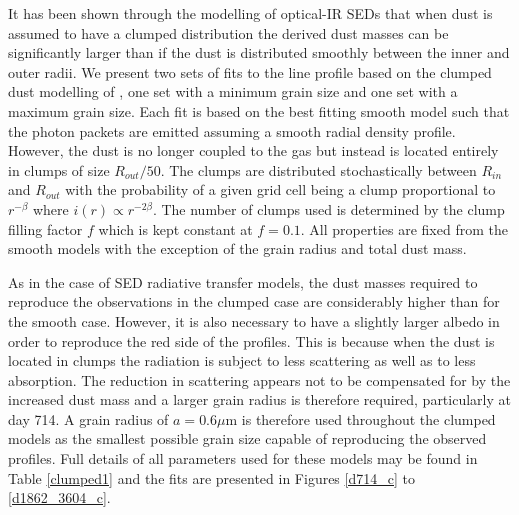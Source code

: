 \documentclass[useAMS,usenatbib,usegraphicx]{mnras}
\begin{document}
It has been shown through the modelling of optical-IR SEDs that when dust 
is assumed to have a clumped distribution the derived dust masses can be 
significantly larger than if the dust is distributed smoothly between the 
inner and outer radii.  We present two sets of fits to the line profile based on 
the clumped dust modelling of \citet{Wesson2015}, one set with a minimum grain size and one set with a maximum grain size.  Each fit is based on the best 
fitting smooth model such that the photon packets are emitted assuming a smooth 
radial density profile.  However, the dust is no longer coupled to the gas 
but instead is located entirely in clumps of size $R_{out}/50$.  The 
clumps are distributed stochastically between $R_{in}$ and $R_{out}$ with 
the probability of a given grid cell being a clump proportional to $r^{- 
\beta }$ where $i(r) \propto r^{-2 \beta}$.  The number of clumps used is 
determined by the clump filling factor $f$ which is kept constant at $f=0.1$.  All 
properties are fixed from the smooth models with the exception of the grain 
radius and total dust mass.

As in the case of SED radiative transfer models, the dust masses required to reproduce the 
observations in the clumped case are considerably higher than for the smooth case.  
However, it is also necessary to have a slightly larger albedo in order to 
reproduce the red side of the profiles.  This is because when 
the dust is located in clumps the radiation is subject to less scattering 
as well as to less absorption.  The reduction in scattering appears not to be 
compensated for by the increased dust mass and a larger grain radius is 
therefore required, particularly at day 714.  A grain radius of $a=0.6\mu$m 
is therefore used throughout the clumped models as the smallest possible 
grain size capable of reproducing the observed profiles. Full details of all 
parameters used for these models may be found in Table \ref{clumped1} and 
the fits are presented in Figures \ref{d714_c} to \ref{d1862_3604_c}.
\end{document}

